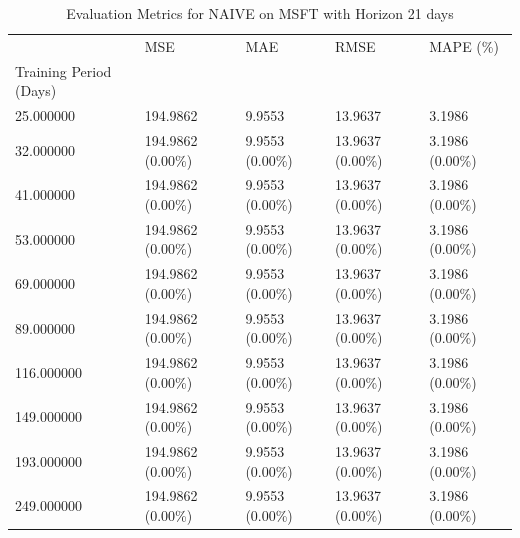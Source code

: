 \begin{table}
\caption{Evaluation Metrics for NAIVE on MSFT with Horizon 21 days}
\label{tab:naive_MSFT_h21_metrics}
\begin{tabular}{lllll}
\toprule
 & MSE & MAE & RMSE & MAPE (\%) \\
Training Period (Days) &  &  &  &  \\
\midrule
25.000000 & 194.9862 & 9.9553 & 13.9637 & 3.1986 \\
32.000000 & 194.9862 (0.00\%) & 9.9553 (0.00\%) & 13.9637 (0.00\%) & 3.1986 (0.00\%) \\
41.000000 & 194.9862 (0.00\%) & 9.9553 (0.00\%) & 13.9637 (0.00\%) & 3.1986 (0.00\%) \\
53.000000 & 194.9862 (0.00\%) & 9.9553 (0.00\%) & 13.9637 (0.00\%) & 3.1986 (0.00\%) \\
69.000000 & 194.9862 (0.00\%) & 9.9553 (0.00\%) & 13.9637 (0.00\%) & 3.1986 (0.00\%) \\
89.000000 & 194.9862 (0.00\%) & 9.9553 (0.00\%) & 13.9637 (0.00\%) & 3.1986 (0.00\%) \\
116.000000 & 194.9862 (0.00\%) & 9.9553 (0.00\%) & 13.9637 (0.00\%) & 3.1986 (0.00\%) \\
149.000000 & 194.9862 (0.00\%) & 9.9553 (0.00\%) & 13.9637 (0.00\%) & 3.1986 (0.00\%) \\
193.000000 & 194.9862 (0.00\%) & 9.9553 (0.00\%) & 13.9637 (0.00\%) & 3.1986 (0.00\%) \\
249.000000 & 194.9862 (0.00\%) & 9.9553 (0.00\%) & 13.9637 (0.00\%) & 3.1986 (0.00\%) \\
\bottomrule
\end{tabular}
\end{table}
